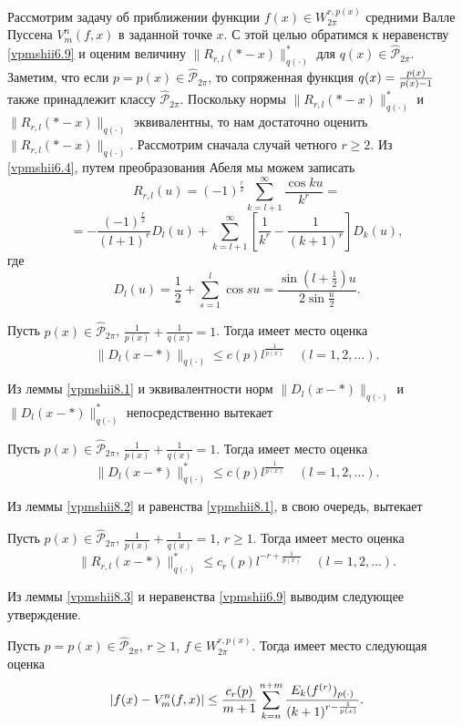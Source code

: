 Рассмотрим задачу об приближении  функции $f(x)\in  W^{r,p(x)}_{2\pi}$ средними Валле Пуссена $V_m^n(f,x)$ в заданной точке $x$. С этой целью обратимся к неравенству \eqref{vpmshii6.9} и оценим величину $\|R_{r,l}(*-x)\|_{q(\cdot)}^*$ для $q(x)\in \hat{\mathcal{  P}}_{2\pi}$. Заметим, что если   $p=p(x)\in\hat{\mathcal{  P}}_{2\pi}$, то сопряженная функция $q(x)={p(x)\over p(x)-1}$ также принадлежит классу $\hat{\mathcal{  P}}_{2\pi}$.  Поскольку нормы $\|R_{r,l}(*-x)\|_{q(\cdot)}^*$ и $\|R_{r,l}(*-x)\|_{q(\cdot)}$ эквивалентны, то нам достаточно оценить $\|R_{r,l}(*-x)\|_{q(\cdot)}$.
 Рассмотрим сначала случай четного $r\ge2$. Из \eqref{vpmshii6.4}, путем преобразования Абеля мы можем записать
$$
 R_{r,l}(u)  =(-1)^{\frac{r}{2}}\sum\limits_{k=l+1}^{\infty}\frac{\cos ku}{ k^r}=
$$
\begin{equation} \label{vpmshii8.1}
    =-\frac{(-1)^\frac{r}{2}}{(l+1)^r}D_l(u)+\sum\limits_{k=l+1}^\infty[\frac{1}{ k^r}-\frac{1}{(k+1)^r}]D_k(u),
\end{equation}
где
$$
D_{l}(u)=\frac12+\sum\limits_{s=1}^{l}\cos su=\frac{\sin(l+\frac12)u}{2\sin\frac{u}2}.
$$

\begin{lemma}\label{vpmshii8.1}
 Пусть  $p(x)\in \hat{\mathcal{ P}}_{2\pi}$,
$\frac{1}{p(x)}+\frac{1}{q(x)}=1$. Тогда имеет место оценка
$$
    \|D_{l}(x-*)\|_{q(\cdot)}\le c(p)l^{\frac{1}{p(x)}}\quad(l=1,2,\ldots).
$$
\end{lemma}

Из леммы \ref{vpmshii8.1} и эквивалентности норм $\|D_{l}(x-*)\|_{q(\cdot)}$ и $\|D_{l}(x-*)\|^*_{q(\cdot)}$ непосредственно вытекает
\begin{lemma}\label{vpmshii8.2}
 Пусть  $p(x)\in \hat{\mathcal{ P}}_{2\pi}$,
$\frac{1}{p(x)}+\frac{1}{q(x)}=1$. Тогда имеет место оценка
$$
    \|D_{l}(x-*)\|^*_{q(\cdot)}\le c(p)l^{\frac{1}{p(x)}}\quad(l=1,2,\ldots).
$$
\end{lemma}
Из леммы \ref{vpmshii8.2} и равенства \eqref{vpmshii8.1}, в свою очередь, вытекает
\begin{lemma}\label{vpmshii8.3}
 Пусть  $p(x)\in \hat{\mathcal{ P}}_{2\pi}$,
$\frac{1}{p(x)}+\frac{1}{q(x)}=1$, $r\ge1$. Тогда имеет место оценка
$$
    \|R_{r,l}(x-*)\|^*_{q(\cdot)}\le c_r(p)l^{-r+{\frac{1}{p(x)}}}\quad(l=1,2,\ldots).
$$
\end{lemma}
Из леммы \ref{vpmshii8.3} и неравенства \eqref{vpmshii6.9} выводим следующее утверждение.

\begin{theorem}\label{vpmshiit7}
Пусть  $p=p(x)\in \hat{\mathcal{  P}}_{2\pi}$, $r\ge1$, $f\in W^{r,p(x)}_{2\pi}$. Тогда имеет место следующая оценка
$$
     |f(x)-V_m^n(f,x)|\le \frac{c_r(p)}{m+1}\sum_{k=n}^{n+m}{E_k(f^{(r)})_{p(\cdot)}\over (k+1)^{r-{\frac{1}{p(x)}}}}.
$$
 \end{theorem}

